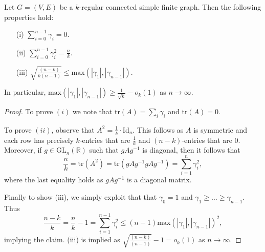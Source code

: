 \begin{lemma}\label{WeakAlonBoppana}
	Let $G = (V,E)$ be a $k$-regular connected simple finite graph. Then the following properties hold:
	\begin{enumerate}
		\item[(i)] $\sum_{i = 0}^{n-1} \gamma_i = 0$.
		\item[(ii)] $\sum_{i = 0}^{n-1} \gamma_i^2 = \frac{n}{k}$.
		\item[(iii)] $\sqrt{\frac{(n-k)}{k (n-1)}} \leq \mathrm{max}(|\gamma_1|, |\gamma_{n-1}|)$.
	\end{enumerate}
	In particular, $\mathrm{max}(|\gamma_1|, |\gamma_{n-1}|) \geq \frac{1}{\sqrt{k}} - o_{k}(1)$ as $n \to \infty$. 
\end{lemma}

\begin{proof}
	To prove $(i)$ we note that $\mathrm{tr}(A) = \sum_{i} \gamma_i$ and $\mathrm{tr}(A) = 0$. 
	
	To prove $(ii)$, observe that $A^2 = \frac{1}{k}\cdot\mathrm{Id}_n$. This follows as $A$ is symmetric and each row has precisely $k$-entries that are $\frac{1}{k}$ and $(n-k)$-entries that are $0$. Moreover, if $g \in \mathrm{GL}_n(\mathbb{R})$ such that $gAg^{-1}$ is diagonal, then it follows that $$\frac{n}{k} = \mathrm{tr}(A^2) = \mathrm{tr}(gAg^{-1}gAg^{-1}) = \sum_{i = 1}^{n} \gamma_i^2,$$ where the last equality holds as $gAg^{-1}$ is a diagonal matrix. 
	
	Finally to show (iii), we simply exploit that that $\gamma_0 = 1$ and $\gamma_1 \geq \ldots \geq \gamma_{n-1}$. Thus $$\frac{n-k}{k} = \frac{n}{k} - 1 = \sum_{i = 1}^{n-1} \gamma_i^2 \leq (n-1)\mathrm{max}(|\gamma_1|, |\gamma_{n-1}|)^2,$$ implying the claim. (iii) is implied as $\sqrt{\frac{(n-k)}{(n-1)}}-1 = o_{k}(1)$ as $n \to \infty$. 
\end{proof}